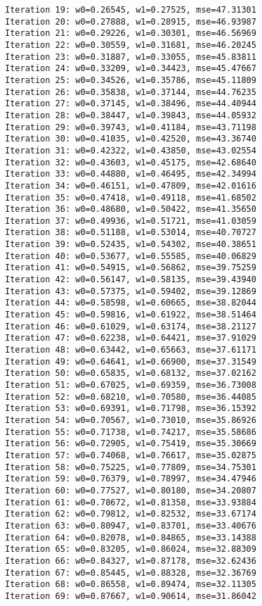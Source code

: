 \documentclass[11pt]{article}
\begin{document}
\begin{Verbatim}[commandchars=\\\{\}]
Iteration 19: w0=0.26545, w1=0.27525, mse=47.31301
Iteration 20: w0=0.27888, w1=0.28915, mse=46.93987
Iteration 21: w0=0.29226, w1=0.30301, mse=46.56969
Iteration 22: w0=0.30559, w1=0.31681, mse=46.20245
Iteration 23: w0=0.31887, w1=0.33055, mse=45.83811
Iteration 24: w0=0.33209, w1=0.34423, mse=45.47667
Iteration 25: w0=0.34526, w1=0.35786, mse=45.11809
Iteration 26: w0=0.35838, w1=0.37144, mse=44.76235
Iteration 27: w0=0.37145, w1=0.38496, mse=44.40944
Iteration 28: w0=0.38447, w1=0.39843, mse=44.05932
Iteration 29: w0=0.39743, w1=0.41184, mse=43.71198
Iteration 30: w0=0.41035, w1=0.42520, mse=43.36740
Iteration 31: w0=0.42322, w1=0.43850, mse=43.02554
Iteration 32: w0=0.43603, w1=0.45175, mse=42.68640
Iteration 33: w0=0.44880, w1=0.46495, mse=42.34994
Iteration 34: w0=0.46151, w1=0.47809, mse=42.01616
Iteration 35: w0=0.47418, w1=0.49118, mse=41.68502
Iteration 36: w0=0.48680, w1=0.50422, mse=41.35650
Iteration 37: w0=0.49936, w1=0.51721, mse=41.03059
Iteration 38: w0=0.51188, w1=0.53014, mse=40.70727
Iteration 39: w0=0.52435, w1=0.54302, mse=40.38651
Iteration 40: w0=0.53677, w1=0.55585, mse=40.06829
Iteration 41: w0=0.54915, w1=0.56862, mse=39.75259
Iteration 42: w0=0.56147, w1=0.58135, mse=39.43940
Iteration 43: w0=0.57375, w1=0.59402, mse=39.12869
Iteration 44: w0=0.58598, w1=0.60665, mse=38.82044
Iteration 45: w0=0.59816, w1=0.61922, mse=38.51464
Iteration 46: w0=0.61029, w1=0.63174, mse=38.21127
Iteration 47: w0=0.62238, w1=0.64421, mse=37.91029
Iteration 48: w0=0.63442, w1=0.65663, mse=37.61171
Iteration 49: w0=0.64641, w1=0.66900, mse=37.31549
Iteration 50: w0=0.65835, w1=0.68132, mse=37.02162
Iteration 51: w0=0.67025, w1=0.69359, mse=36.73008
Iteration 52: w0=0.68210, w1=0.70580, mse=36.44085
Iteration 53: w0=0.69391, w1=0.71798, mse=36.15392
Iteration 54: w0=0.70567, w1=0.73010, mse=35.86926
Iteration 55: w0=0.71738, w1=0.74217, mse=35.58686
Iteration 56: w0=0.72905, w1=0.75419, mse=35.30669
Iteration 57: w0=0.74068, w1=0.76617, mse=35.02875
Iteration 58: w0=0.75225, w1=0.77809, mse=34.75301
Iteration 59: w0=0.76379, w1=0.78997, mse=34.47946
Iteration 60: w0=0.77527, w1=0.80180, mse=34.20807
Iteration 61: w0=0.78672, w1=0.81358, mse=33.93884
Iteration 62: w0=0.79812, w1=0.82532, mse=33.67174
Iteration 63: w0=0.80947, w1=0.83701, mse=33.40676
Iteration 64: w0=0.82078, w1=0.84865, mse=33.14388
Iteration 65: w0=0.83205, w1=0.86024, mse=32.88309
Iteration 66: w0=0.84327, w1=0.87178, mse=32.62436
Iteration 67: w0=0.85445, w1=0.88328, mse=32.36769
Iteration 68: w0=0.86558, w1=0.89474, mse=32.11305
Iteration 69: w0=0.87667, w1=0.90614, mse=31.86042

\end{Verbatim}
\end{document}
